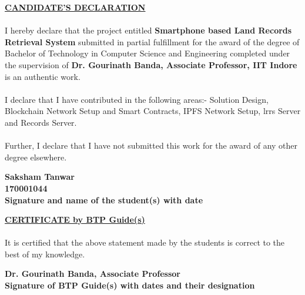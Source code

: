 \documentclass[12pt]{article}
\newcommand{\mainauth}{Saksham Tanwar}
\newcommand{\roll}{170001044}
\begin{document}
{
    \begin{center}
        \textbf{\underline{\large{CANDIDATE’S DECLARATION}}}
    \end{center}

    \paragraph{}
    I hereby declare that the project entitled \textbf{Smartphone based Land Records Retrieval System} submitted in partial fulfillment for the award of the degree of Bachelor of Technology in Computer Science and Engineering completed under the supervision of \textbf{Dr. Gourinath Banda, Associate Professor, IIT Indore} is an authentic work.

    \paragraph{}
    I declare that I have contributed in the following areas:- Solution Design, Blockchain Network Setup and Smart Contracts, IPFS Network Setup, \acrshort{lrrs} Server and Records Server.

    \paragraph{}
    Further, I declare that I have not submitted this work for the award of any other degree elsewhere.

    \vspace{2cm}

    \begin{flushright}
        \textbf{\mainauth}\\
        \textbf{\roll}\\
        \textbf{Signature and name of the student(s) with date}
    \end{flushright}
    \vspace{1cm}

    \begin{center}
        \textbf{\underline{\large{CERTIFICATE by BTP Guide(s)}}}
    \end{center}

    \paragraph{}
    It is certified that the above statement made by the students is correct to the best of my knowledge.

    \vspace{2cm}

    \begin{flushright}
        \textbf{Dr. Gourinath Banda, Associate Professor}\\
        \textbf{Signature of BTP Guide(s) with dates and their designation}
    \end{flushright}

    \thispagestyle{empty}
}
\clearpage
\end{document}
